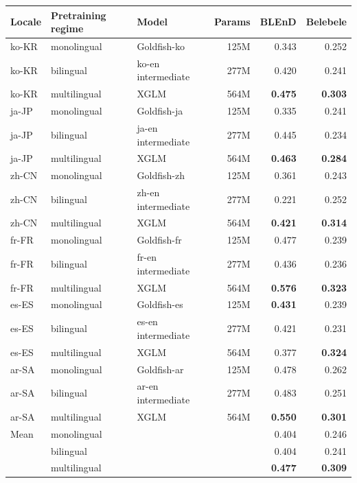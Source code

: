 \begin{table}[t]
\centering
\small
{}
\label{tab:regime_sub1b}
\begin{tabular}{lllrrr}
\toprule
Locale & Pretraining regime & Model & Params & BLEnD & Belebele \\
\midrule
ko-KR & monolingual & Goldfish-ko & 125M & 0.343 & 0.252 \\
ko-KR & bilingual & ko-en intermediate & 277M & 0.420 & 0.241 \\
ko-KR & multilingual & XGLM & 564M & \textbf{0.475} & \textbf{0.303} \\
\midrule
ja-JP & monolingual & Goldfish-ja & 125M & 0.335 & 0.241 \\
ja-JP & bilingual & ja-en intermediate & 277M & 0.445 & 0.234 \\
ja-JP & multilingual & XGLM & 564M & \textbf{0.463} & \textbf{0.284} \\
\midrule
zh-CN & monolingual & Goldfish-zh & 125M & 0.361 & 0.243 \\
zh-CN & bilingual & zh-en intermediate & 277M & 0.221 & 0.252 \\
zh-CN & multilingual & XGLM & 564M & \textbf{0.421} & \textbf{0.314} \\
\midrule
fr-FR & monolingual & Goldfish-fr & 125M & 0.477 & 0.239 \\
fr-FR & bilingual & fr-en intermediate & 277M & 0.436 & 0.236 \\
fr-FR & multilingual & XGLM & 564M & \textbf{0.576} & \textbf{0.323} \\
\midrule
es-ES & monolingual & Goldfish-es & 125M & \textbf{0.431} & 0.239 \\
es-ES & bilingual & es-en intermediate & 277M & 0.421 & 0.231 \\
es-ES & multilingual & XGLM & 564M & 0.377 & \textbf{0.324} \\
\midrule
ar-SA & monolingual & Goldfish-ar & 125M & 0.478 & 0.262 \\
ar-SA & bilingual & ar-en intermediate & 277M & 0.483 & 0.251 \\
ar-SA & multilingual & XGLM & 564M & \textbf{0.550} & \textbf{0.301} \\
\midrule
Mean & monolingual & & & 0.404 & 0.246 \\
 & bilingual & & & 0.404 & 0.241 \\
 & multilingual & & & \textbf{0.477} & \textbf{0.309} \\
\bottomrule
\end{tabular}
\end{table}
